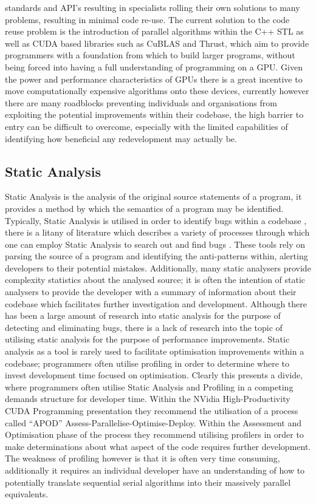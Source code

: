 standards and API’s resulting in specialists rolling their own solutions to many problems, resulting
in minimal code re-use. The current solution to the code reuse problem is the introduction of
parallel algorithms within the C++ STL as well as CUDA based libraries such as CuBLAS and Thrust,
which aim to provide programmers with a foundation from which to build larger programs, without
being forced into having a full understanding of programming on a GPU. Given the power and
performance characteristics of GPUs there is a great incentive to move computationally expensive
algorithms onto these devices, currently however there are many roadblocks preventing individuals
and organisations from exploiting the potential improvements within their codebase, the high barrier
to entry can be difficult to overcome, especially with the limited capabilities of identifying how
beneficial any redevelopment may actually be.

\subsection{Static Analysis}
Static Analysis is the analysis of the original source statements of a program, it provides a method
by which the semantics of a program may be identified.  Typically, Static Analysis is utilised in
order to identify bugs within a codebase \cite{bessey2010few}, there is a litany of literature which
describes a variety of processes through which one can employ Static Analysis to search out and find
bugs \cite{ball2001automatically} \cite{bush2000static}. These tools rely on parsing the source of a
program and identifying the anti-patterns within, alerting developers to their potential mistakes.
Additionally, many static analysers provide complexity statistics about the analysed source; it is
often the intention of static analysers to provide the developer with a summary of information about
their codebase which facilitates further investigation and development.  Although there has been a
large amount of research into static analysis for the purpose of detecting and eliminating bugs,
there is a lack of research into the topic of utilising static analysis for the purpose of
performance improvements.  Static analysis as a tool is rarely used to facilitate optimisation
improvements within a codebase; programmers often utilise profiling in order to determine where to
invest development time focused on optimisation.  Clearly this presents a divide, where programmers
often utilise Static Analysis and Profiling in a competing demands structure for developer time.
Within the NVidia High-Productivity CUDA Programming presentation \cite{nvidiapresentation} they
recommend the utilisation of a process called “APOD” Assess-Parallelise-Optimise-Deploy.  Within the
Assessment and Optimisation phase of the process they recommend utilising profilers in order to make
determinations about what aspect of the code requires further development. The weakness of profiling
however is that it is often very time consuming, additionally it requires an individual developer
have an understanding of how to potentially translate sequential serial algorithms into their
massively parallel equivalents. 

